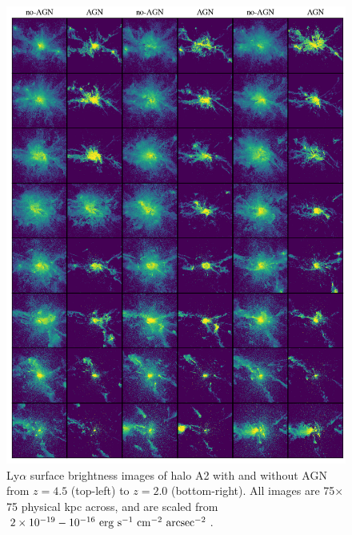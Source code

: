 \begin{figure}
    \centering
    \includegraphics[width=\textwidth,keepaspectratio]{figures/agn_rogues_A2.png}
    \caption{
        Ly$\alpha$ surface brightness images of halo A2 with and without AGN from $z=4.5$ (top-left) to $z=2.0$ (bottom-right).
        All images are 75$\times$75 physical kpc across, and are scaled from $2\times 10^{-19}-10^{-16}\ \rm{erg}\ \rm{s}^{-1}\ \rm{cm}^{-2}\ \rm{arcsec}^{-2}$.
    }
  \label{fig:agn_rogues2}
\end{figure}

